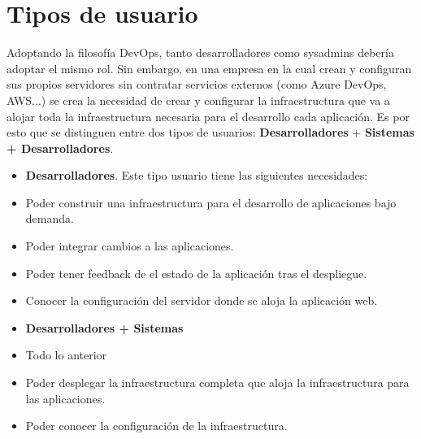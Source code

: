 \section{Tipos de usuario}
	\begin{paragraph}
		Adoptando la filosofía DevOps, tanto desarrolladores como sysadmins debería adoptar el mismo rol. Sin embargo, en una empresa en la cual crean y configuran sus propios servidores sin contratar servicios externos (como Azure DevOps, AWS...) se crea la necesidad de crear y configurar la infraestructura que va a alojar toda la infraestructura necesaria para el desarrollo cada aplicación. Es por esto que se distinguen entre dos tipos de usuarios: \textbf{Desarrolladores} + \textbf{Sistemas + Desarrolladores}.  
		
		\begin{itemize}
			\item \textbf{Desarrolladores}. Este tipo usuario tiene las siguientes necesidades:
				\item Poder construir una infraestructura para el desarrollo de aplicaciones bajo demanda.
				\item Poder integrar cambios a las aplicaciones.
				\item Poder tener feedback de el estado de la aplicación tras el despliegue.
				\item Conocer la configuración del servidor donde se aloja la aplicación web.
			\item \textbf{Desarrolladores + Sistemas}
				\item Todo lo anterior
				\item Poder desplegar la infraestructura completa que aloja la infraestructura para las aplicaciones.
				\item Poder conocer la configuración de la infraestructura.
		\end{itemize}
	\end{paragraph}